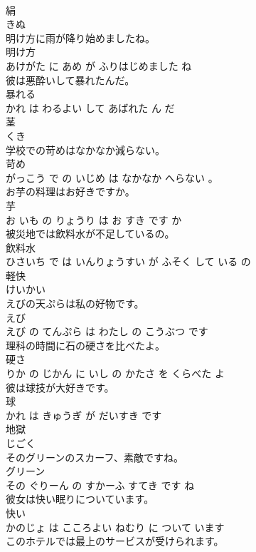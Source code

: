 \documentclass[8pt]{extreport}
\begin{document}
\begin{CJK}{UTF8}{min}
\\	絹	
\\	きぬ			
\\	明け方に雨が降り始めましたね。	
\\	明け方 
\\	あけがた に あめ が ふりはじめました ね			
\\	彼は悪酔いして暴れたんだ。	
\\	暴れる 
\\	かれ は わるよい して あばれた ん だ			
\\	茎	
\\	くき			
\\	学校での苛めはなかなか減らない。	
\\	苛め 
\\	がっこう で の いじめ は なかなか へらない 。			
\\	お芋の料理はお好きですか。	
\\	芋 
\\	お いも の りょうり は お すき です か			
\\	被災地では飲料水が不足しているの。	
\\	飲料水 
\\	ひさいち で は いんりょうすい が ふそく して いる の			
\\	軽快	
\\	けいかい			
\\	えびの天ぷらは私の好物です。	
\\	えび 
\\	えび の てんぷら は わたし の こうぶつ です			
\\	理科の時間に石の硬さを比べたよ。	
\\	硬さ 
\\	りか の じかん に いし の かたさ を くらべた よ			
\\	彼は球技が大好きです。	
\\	球 
\\	かれ は きゅうぎ が だいすき です			
\\	地獄	
\\	じごく			
\\	そのグリーンのスカーフ、素敵ですね。	
\\	グリーン 
\\	その ぐりーん の すかーふ すてき です ね			
\\	彼女は快い眠りについています。	
\\	快い 
\\	かのじょ は こころよい ねむり に ついて います			
\\	このホテルでは最上のサービスが受けられます。	

\end{CJK}
\end{document}
